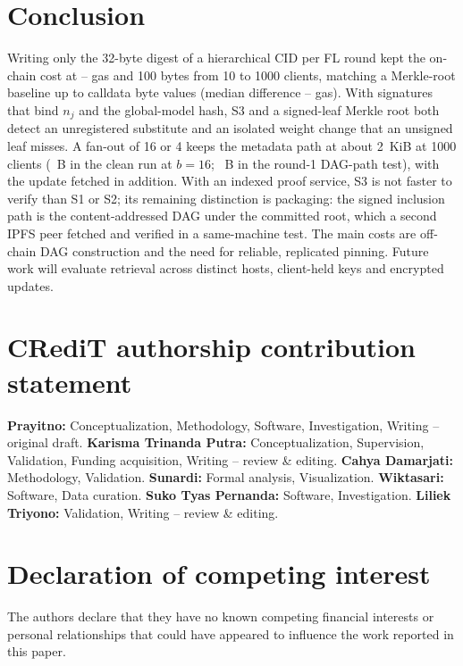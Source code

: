 \documentclass[final,3p,times,twocolumn]{elsarticle}
\begin{document}
\section{Conclusion}\label{sec:concl}
Writing only the 32-byte digest of a hierarchical CID per FL round kept the on-chain cost at -- gas and 100 bytes from 10 to 1000 clients, matching a Merkle-root baseline up to calldata byte values (median difference -- gas). With signatures that bind $n_j$ and the global-model hash, S3 and a signed-leaf Merkle root both detect an unregistered substitute and an isolated weight change that an unsigned leaf misses. A fan-out of 16 or 4 keeps the metadata path at about 2~KiB at 1000 clients (~B in the clean run at $b=16$; ~B in the round-1 DAG-path test), with the update fetched in addition. With an indexed proof service, S3 is not faster to verify than S1 or S2; its remaining distinction is packaging: the signed inclusion path is the content-addressed DAG under the committed root, which a second IPFS peer fetched and verified in a same-machine test. The main costs are off-chain DAG construction and the need for reliable, replicated pinning. Future work will evaluate retrieval across distinct hosts, client-held keys and encrypted updates.
\label{bodyend}

\section*{CRediT authorship contribution statement}
\textbf{Prayitno:} Conceptualization, Methodology, Software, Investigation, Writing -- original draft. \textbf{Karisma Trinanda Putra:} Conceptualization, Supervision, Validation, Funding acquisition, Writing -- review \& editing. \textbf{Cahya Damarjati:} Methodology, Validation. \textbf{Sunardi:} Formal analysis, Visualization. \textbf{Wiktasari:} Software, Data curation. \textbf{Suko Tyas Pernanda:} Software, Investigation. \textbf{Liliek Triyono:} Validation, Writing -- review \& editing.

\section*{Declaration of competing interest}
The authors declare that they have no known competing financial interests or personal relationships that could have appeared to influence the work reported in this paper.
\end{document}
